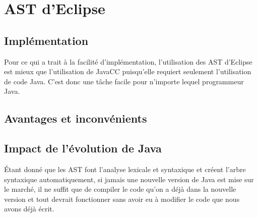\documentclass[11pt,french]{article}
\begin{document}
    \section{AST d'Eclipse} %
    \label{sec:ast-eclipse}
        \subsection{Implémentation} %
        \label{sub:implementation}
        Pour ce qui a trait à la facilité d'implémentation, l'utilisation des AST d'Eclipse est mieux que l'utilisation de
        JavaCC puisqu'elle requiert seulement l'utilisation de code Java. C'est donc une tâche facile pour n'importe lequel
        programmeur Java.
        \subsection{Avantages et inconvénients} %
        \label{sub:avantages-inconvenients}


        \subsection{Impact de l'évolution de Java} %
        \label{sub:impact-evolution-java}
        Étant donné que les AST font l'analyse lexicale et syntaxique et créent l'arbre syntaxique automatiquement, 
        si jamais une nouvelle version de Java est mise sur le marché, il ne suffit que de compiler le code qu'on a
        déjà dans la nouvelle version et tout devrait fonctionner sans avoir eu à modifier le code que nous avons 
        déjà écrit.
\end{document}

